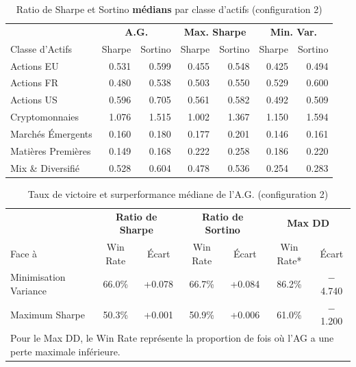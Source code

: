 \begin{table}[H]
\centering
\caption{Ratio de Sharpe et Sortino \textbf{médians} par classe d'actifs (configuration 2)\label{tab:asset_conf2}}
\footnotesize
\begin{tabular}{l|rr|rr|rr}
\toprule
& \multicolumn{2}{c|}{\textbf{A.G.}} & \multicolumn{2}{c|}{\textbf{Max. Sharpe}} & \multicolumn{2}{c}{\textbf{Min. Var.}} \\
Classe d'Actifs & Sharpe & Sortino & Sharpe & Sortino & Sharpe & Sortino \\
\midrule
Actions EU & 0.531 & 0.599 & 0.455 & 0.548 & 0.425 & 0.494 \\
Actions FR & 0.480 & 0.538 & 0.503 & 0.550 & 0.529 & 0.600 \\
Actions US & 0.596 & 0.705 & 0.561 & 0.582 & 0.492 & 0.509 \\
Cryptomonnaies & 1.076 & 1.515 & 1.002 & 1.367 & 1.150 & 1.594 \\
Marchés Émergents & 0.160 & 0.180 & 0.177 & 0.201 & 0.146 & 0.161 \\
Matières Premières & 0.149 & 0.168 & 0.222 & 0.258 & 0.186 & 0.220 \\
Mix \& Diversifié & 0.528 & 0.604 & 0.478 & 0.536 & 0.254 & 0.283 \\
\bottomrule
\end{tabular}
\end{table}

\begin{table}[H]
\centering
\caption{Taux de victoire et surperformance médiane de l'A.G. (configuration 2)\label{tab:win_conf2}}
\footnotesize
\begin{tabular}{lcc|cc|cc}
\toprule
 & \multicolumn{2}{c|}{\textbf{Ratio de Sharpe}} & \multicolumn{2}{c|}{\textbf{Ratio de Sortino}} & \multicolumn{2}{c}{\textbf{Max DD}} \\
Face à & Win Rate & Écart & Win Rate & Écart & Win Rate* & Écart \\
\midrule
Minimisation Variance & 66.0\% & +0.078 & 66.7\% & +0.084 & 86.2\% & $-$4.740 \\
Maximum Sharpe & 50.3\% & +0.001 & 50.9\% & +0.006 & 61.0\% & $-$1.200 \\
\bottomrule
\multicolumn{7}{l}{\scriptsize *Pour le Max DD, le Win Rate représente la proportion de fois où l'AG a une perte maximale inférieure.} \\
\end{tabular}
\end{table}

